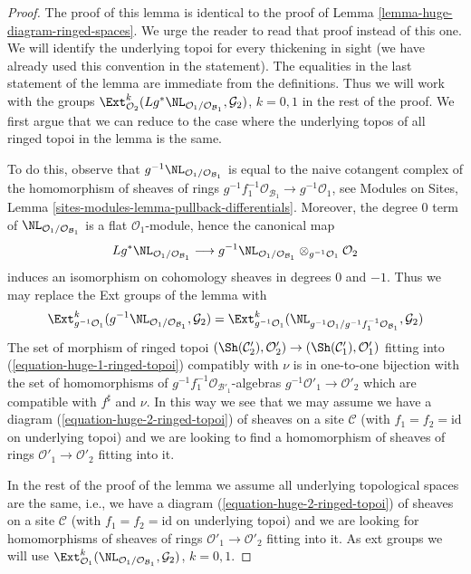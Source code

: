 \begin{proof}
The proof of this lemma is identical to the proof of
Lemma \ref{lemma-huge-diagram-ringed-spaces}.
We urge the reader to read that proof instead of this one.
We will identify the underlying topoi for every
thickening in sight (we have already used this convention
in the statement). The equalities in the last statement of the
lemma are immediate from the definitions. Thus we will work with the groups
$\Ext^k_{\mathcal{O}_2}(
Lg^*\NL_{\mathcal{O}_1/\mathcal{O}_{\mathcal{B}_1}}, \mathcal{G}_2)$,
$k = 0, 1$ in the rest of the proof. We first argue that we can reduce
to the case where the underlying topos of all ringed topoi in the lemma
is the same.

\medskip\noindent
To do this, observe that
$g^{-1}\NL_{\mathcal{O}_1/\mathcal{O}_{\mathcal{B}_1}}$ is equal to the naive
cotangent complex of the homomorphism of sheaves of rings
$g^{-1}f_1^{-1}\mathcal{O}_{\mathcal{B}_1} \to g^{-1}\mathcal{O}_1$, see
Modules on Sites, Lemma \ref{sites-modules-lemma-pullback-differentials}.
Moreover, the degree $0$ term of
$\NL_{\mathcal{O}_1/\mathcal{O}_{\mathcal{B}_1}}$ is a flat
$\mathcal{O}_1$-module, hence the canonical map
$$
Lg^*\NL_{\mathcal{O}_1/\mathcal{O}_{\mathcal{B}_1}}
\longrightarrow
g^{-1}\NL_{\mathcal{O}_1/\mathcal{O}_{\mathcal{B}_1}}
\otimes_{g^{-1}\mathcal{O}_1} \mathcal{O}_2
$$
induces an isomorphism on cohomology sheaves in degrees $0$ and $-1$.
Thus we may replace the Ext groups of the lemma with
$$
\Ext^k_{g^{-1}\mathcal{O}_1}(
g^{-1}\NL_{\mathcal{O}_1/\mathcal{O}_{\mathcal{B}_1}}, \mathcal{G}_2) =
\Ext^k_{g^{-1}\mathcal{O}_1}(
\NL_{g^{-1}\mathcal{O}_1/g^{-1}f_1^{-1}\mathcal{O}_{\mathcal{B}_1}},
\mathcal{G}_2)
$$
The set of morphism of ringed topoi
$(\Sh(\mathcal{C}'_2), \mathcal{O}'_2) \to
(\Sh(\mathcal{C}'_1), \mathcal{O}'_1)$ fitting into
(\ref{equation-huge-1-ringed-topoi}) compatibly with $\nu$ is in
one-to-one bijection with the set of homomorphisms of
$g^{-1}f_1^{-1}\mathcal{O}_{\mathcal{B}'_1}$-algebras
$g^{-1}\mathcal{O}'_1 \to \mathcal{O}'_2$ which are compatible with
$f^\sharp$ and $\nu$. In this way we see that we may assume we have a
diagram (\ref{equation-huge-2-ringed-topoi}) of sheaves on a site
$\mathcal{C}$ (with $f_1 = f_2 = \text{id}$ on underlying topoi)
and we are looking to find a homomorphism of sheaves of rings
$\mathcal{O}'_1 \to \mathcal{O}'_2$ fitting into it.

\medskip\noindent
In the rest of the proof of the lemma we assume
all underlying topological spaces are the
same, i.e., we have a diagram (\ref{equation-huge-2-ringed-topoi})
of sheaves on a site $\mathcal{C}$ (with $f_1 = f_2 = \text{id}$
on underlying topoi) and we are looking for
homomorphisms of sheaves of rings
$\mathcal{O}'_1 \to \mathcal{O}'_2$ fitting into it.
As ext groups we will use
$\Ext^k_{\mathcal{O}_1}(
\NL_{\mathcal{O}_1/\mathcal{O}_{\mathcal{B}_1}}, \mathcal{G}_2)$, $k = 0, 1$.


\end{proof}
